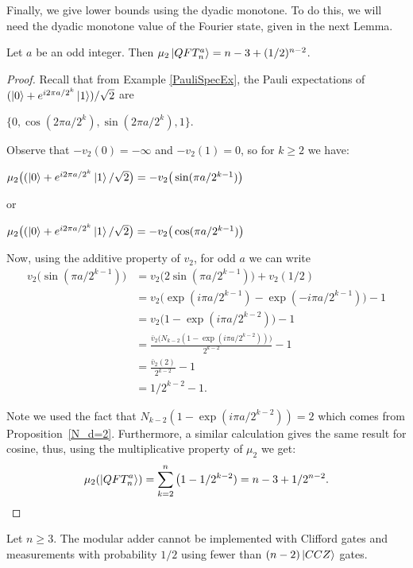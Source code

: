\documentclass[12pt]{dalthesis}
\begin{document}
Finally, we give lower bounds using the dyadic monotone. To do this, we will need the dyadic monotone value of the Fourier state, given in the next Lemma.

\begin{lemma}
  \label{lem:fourrierstate}
Let $a$ be an odd integer. Then $\mu_2\ket{QFT_n^a} = n-3 +(1/2)^{n-2}$.
\end{lemma}

\begin{proof}
Recall that from Example \ref{PauliSpecEx}, the Pauli expectations of $(\ket{0} + e^{i2\pi a/2^k}\ket{1})/\sqrt{2}$ are 
\begin{center}
$\{ 0, \cos(2\pi a/2^k), \sin(2\pi a/2^k), 1 \}$.
\end{center}
Observe that $-v_2(0) = -\infty$ and $-v_2(1) = 0$, so for $k \geq 2$ we have:
\begin{center}
$\mu_2 \big( (\ket{0} + e^{i2\pi a/2^k} \ket{1}/\sqrt{2} \big) = -v_2 \big( \sin(\pi a/2^{k-1}) \big)$
\end{center}
or
\begin{center}
$\mu_2 \big( (\ket{0} + e^{i2\pi a/2^k} \ket{1}/\sqrt{2} \big) = -v_2 \big(\cos(\pi a/2^{k-1}) \big)$
\end{center}

Now, using the additive property of $v_2$, for odd $a$ we can write
\begin{align*}
v_2 \big( \sin(\pi a/2^{k-1}) \big) & = v_2 \big( 2\sin(\pi a/2^{k-1}) \big) + v_2(1/2) \\
& = v_2 \big( \exp(i\pi a/2^{k-1}) - \exp(-i\pi a/2^{k-1}) \big) - 1 \\
& = v_2 \big( 1 - \exp(i\pi a/2^{k-2}) \big) - 1 \\
& = \frac{\bar{v}_2 \big( N_{k-2}(1 - \exp(i\pi a/2^{k-2})) \big)}{2^{k-2}} - 1 \\
& = \frac{\bar{v}_2 (2)}{2^{k-2}} - 1 \\
& = 1/2^{k-2} - 1.
\end{align*}

Note we used the fact that $N_{k-2}(1 - \exp(i\pi a/2^{k-2})) = 2$ which comes from Proposition~\ref{N_d=2}. Furthermore, a similar calculation gives the same result for cosine, thus, using the multiplicative property of $\mu_2$ we get:
\[
\mu_2 (\ket{QFT_n^a}) = \sum\limits_{k=2}^n \big( 1-1/2^{k-2}) = n-3 + 1/2^{n-2}.
\]
\end{proof}

\begin{proposition}
Let $n\geq 3$. The modular adder cannot be implemented with Clifford
gates and measurements with probability $1/2$ using fewer than
$(n-2) \ket{CCZ}$ gates.
\end{proposition}
\end{document}
